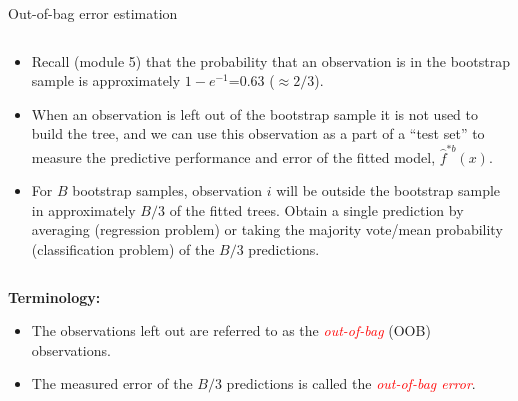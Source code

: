 \documentclass[10pt,ignorenonframetext,]{beamer}
\providecommand{\tightlist}{%
  \setlength{\itemsep}{0pt}\setlength{\parskip}{0pt}}
\begin{document}
\begin{frame}

\begin{block}{Out-of-bag error estimation}

\(~\)

\begin{itemize}
\tightlist
\item
  Recall (module 5) that the probability that an observation is in the
  bootstrap sample is approximately \(1-e^{-1}\)=0.63 (\(\approx 2/3\)).
\end{itemize}

\vspace{1mm}

\begin{itemize}
\tightlist
\item
  When an observation is left out of the bootstrap sample it is not used
  to build the tree, and we can use this observation as a part of a
  ``test set'' to measure the predictive performance and error of the
  fitted model, \(\hat{f}^{*b}(x)\).
\end{itemize}

\vspace{1mm}

\begin{itemize}
\tightlist
\item
  For \(B\) bootstrap samples, observation \(i\) will be outside the
  bootstrap sample in approximately \(B/3\) of the fitted trees. Obtain
  a single prediction by averaging (regression problem) or taking the
  majority vote/mean probability (classification problem) of the \(B/3\)
  predictions.
\end{itemize}

\(~\)

\textbf{Terminology:}

\begin{itemize}
\item
  The observations left out are referred to as the
  \emph{\textcolor{red}{out-of-bag}} (OOB) observations.
\item
  The measured error of the \(B/3\) predictions is called the
  \emph{\textcolor{red}{out-of-bag error}}.
\end{itemize}

\end{block}

\end{frame}
\end{document}
